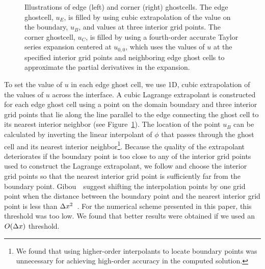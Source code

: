 \documentclass[oneeqnum,onefignum,onetabnum,onethmnum]{siamltex}
\begin{document}
\begin{figure}[tb]
\begin{center}
\caption{Illustrations of edge (left) and corner (right) ghostcells.
The edge ghostcell, $u_E$, is filled by using cubic extrapolation of 
the value on the boundary, $u_B$, and values at three interior grid points.  
The corner ghostcell, $u_C$, is filled by using a fourth-order accurate
Taylor series expansion centered at $u_{0,0}$, which uses the values of $u$ 
at the specified interior grid points and neighboring edge ghost cells to 
approximate the partial derivatives in the expansion. 
}
\label{fig:ghost_cells}
\end{center}
\end{figure}

To set the value of $u$ in each edge ghost cell, we use 1D, cubic 
extrapolation of the values of $u$ across the interface.  A cubic Lagrange 
extrapolant is constructed for each edge ghost cell using a point on the 
domain boundary and three interior grid points that lie along the line 
parallel to the edge connecting the ghost cell to its nearest interior 
neighbor (see Figure~\ref{fig:ghost_cells}).  
The location of the point $u_B$ can be calculated by inverting the linear 
interpolant of $\phi$ that passes through the ghost cell and its nearest
interior neighbor\footnote{We found that using higher-order interpolants to 
locate boundary points was unnecessary for achieving high-order accuracy in 
the computed solution.}.
Because the quality of the extrapolant deteriorates if the boundary point is 
too close to any of the interior grid 
points used to construct the Lagrange extrapolant, we follow 
\cite{gibou_2005} and choose the interior grid points so that the nearest
interior grid point is sufficiently far from the boundary point.  
Gibou~\etal~suggest shifting the interpolation points by one grid point 
when the distance between the boundary point and the nearest interior grid 
point is less than $\Delta x^2$~\cite{gibou_2005}.  For the numerical scheme 
presented in this paper, this threshold was too low.  We found that better 
results were obtained if we used an $O(\Delta x)$ threshold.
\end{document}
